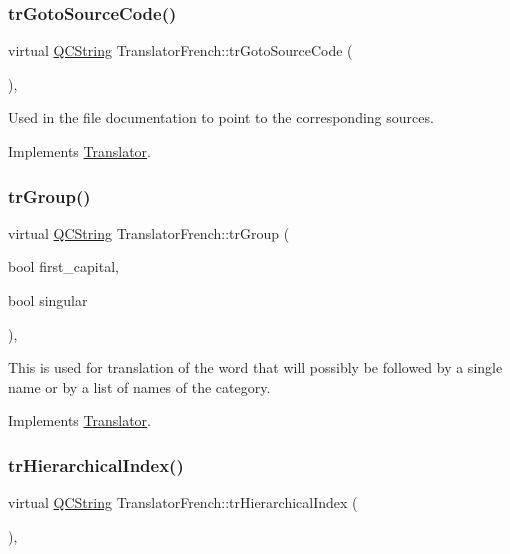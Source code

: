 \subsubsection{\texorpdfstring{trGotoSourceCode()}{trGotoSourceCode()}}
{\footnotesize\ttfamily virtual \mbox{\hyperlink{class_q_c_string}{Q\+C\+String}} Translator\+French\+::tr\+Goto\+Source\+Code (\begin{DoxyParamCaption}{ }\end{DoxyParamCaption})\hspace{0.3cm}{\ttfamily [inline]}, {\ttfamily [virtual]}}

Used in the file documentation to point to the corresponding sources. 

Implements \mbox{\hyperlink{class_translator}{Translator}}.

\mbox{\label{class_translator_french_a1e6f6fd5260bad075ae22349d2f81f0c}} 
\subsubsection{\texorpdfstring{trGroup()}{trGroup()}}
{\footnotesize\ttfamily virtual \mbox{\hyperlink{class_q_c_string}{Q\+C\+String}} Translator\+French\+::tr\+Group (\begin{DoxyParamCaption}\item[{bool}]{first\+\_\+capital,  }\item[{bool}]{singular }\end{DoxyParamCaption})\hspace{0.3cm}{\ttfamily [inline]}, {\ttfamily [virtual]}}

This is used for translation of the word that will possibly be followed by a single name or by a list of names of the category. 

Implements \mbox{\hyperlink{class_translator}{Translator}}.

\mbox{\label{class_translator_french_a15f66ce3f42370f2b8ebe01b9bdb4f46}} 
\subsubsection{\texorpdfstring{trHierarchicalIndex()}{trHierarchicalIndex()}}
{\footnotesize\ttfamily virtual \mbox{\hyperlink{class_q_c_string}{Q\+C\+String}} Translator\+French\+::tr\+Hierarchical\+Index (\begin{DoxyParamCaption}{ }\end{DoxyParamCaption})\hspace{0.3cm}{\ttfamily [inline]}, {\ttfamily [virtual]}}

